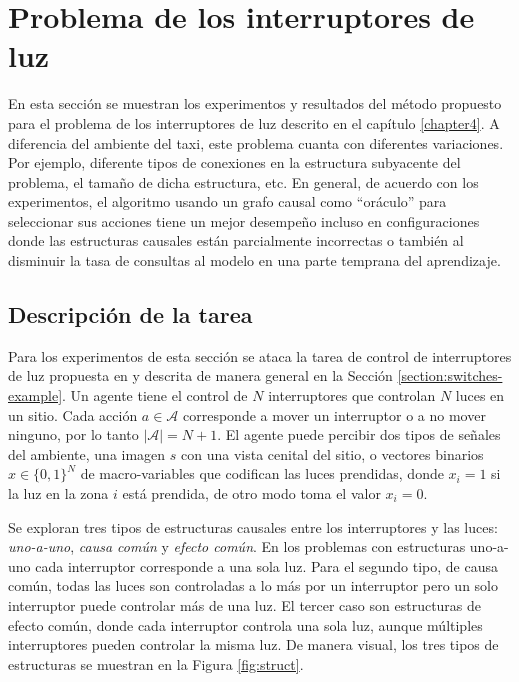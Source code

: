 \section{Problema de los interruptores de luz}

En esta sección se muestran los experimentos y resultados del método propuesto para
el problema de los interruptores de luz descrito en el capítulo \ref{chapter4}.
A diferencia del ambiente del taxi, este problema cuanta 
con diferentes variaciones. Por ejemplo,
diferente tipos de conexiones en la estructura subyacente del problema, el tamaño de dicha estructura, etc.
En general, de acuerdo con los experimentos, el algoritmo usando un grafo causal como ``oráculo'' para seleccionar sus acciones tiene un mejor desempeño incluso en 
configuraciones donde las estructuras causales están parcialmente incorrectas o también 
al disminuir la tasa de consultas al modelo en una parte temprana del aprendizaje.


\subsection{Descripción de la tarea}
Para los experimentos de esta sección se ataca la tarea de control de interruptores de luz propuesta en \cite{nair2019causal} y descrita de manera general en la Sección \ref{section:switches-example}. Un agente tiene el control
de $N$ interruptores que controlan $N$ luces en un sitio.
Cada acción $a\in \mathcal{A}$ corresponde a mover un interruptor o 
a no mover ninguno, por lo tanto $|\mathcal{A}| = N + 1$.
El agente puede percibir dos tipos de señales del ambiente,
una imagen $s$ con una vista cenital del sitio, o vectores binarios $x \in \{0,1\}^N$ de 
macro-variables que codifican las luces prendidas, donde
$x_i = 1$ si la luz en la zona $i$ está prendida, de otro modo 
toma el valor $x_i = 0$.

Se exploran tres tipos de estructuras causales entre los
interruptores y las luces: \textit{uno-a-uno},
\textit{causa común} y \textit{efecto común}.
En los problemas con estructuras uno-a-uno cada interruptor corresponde a una sola luz.
Para el segundo tipo, de causa común, todas
las luces son controladas a lo más por un interruptor pero un
solo interruptor puede controlar más de una luz.
El tercer caso son estructuras de efecto común, donde cada interruptor
controla una sola luz, aunque múltiples interruptores
pueden controlar la misma luz. De manera visual, los tres tipos de estructuras
se muestran en la Figura \ref{fig:struct}.

